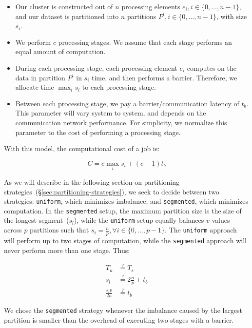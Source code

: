 \documentclass[preprint]{sigplanconf}
\theoremstyle{definition}
\begin{document}
\begin{itemize}
\item Our cluster is constructed out of $n$ processing elements $e_i, i \in \{0, \ldots, n - 1\}$, and our
dataset is partitioned into $n$ partitions $P^i, i \in \{0, \ldots, n - 1\}$, with size $s_i$.
\item We perform $c$ processing stages. We assume that each stage performs an equal amount of
computation.
\item During each processing stage, each processing element $e_i$ computes on the data in partition
$P^i$ in $s_i$ time, and then performs a barrier. Therefore, we allocate time $\max_i s_i$ to each
processing stage.
\item Between each processing stage, we pay a barrier/communication latency of $t_b$. This parameter
will vary system to system, and depends on the communication network performance. For simplicity, we
normalize this parameter to the cost of performing a processing stage.
\end{itemize}

With this model, the computational cost of a job is:

$$
C = c \max_i s_i + (c - 1) t_b
$$

As we will describe in the following section on partitioning strategies~(\S\ref{sec:partitioning-strategies}),
we seek to decide between two strategies: \texttt{uniform}, which minimizes imbalance, and
\texttt{segmented}, which minimizes computation. In the \texttt{segmented} setup, the maximum
partition size is the size of the longest segment~($s_l$), while the \texttt{uniform} setup equally balances
$v$ values across $p$ partitions such that $s_i = \frac{n}{p}, \forall i \in \{0, \ldots, p - 1\}$. The
\texttt{uniform} approach will perform up to two stages of computation, while the \texttt{segmented}
approach will never perform more than one stage. Thus:

\begin{equation*}
\begin{split}
T_u &\overset{?}{=} T_s \\
s_l &\overset{?}{=} 2 \frac{n}{p} + t_b \\
\frac{s_l p}{2 n} &\overset{?}{=} t_b
\end{split}
\end{equation*}

We chose the \texttt{segmented} strategy whenever the imbalance caused by the largest partition is
smaller than the overhead of executing two stages with a barrier.
\end{document}
